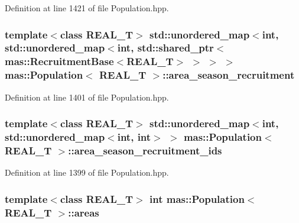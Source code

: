 Definition at line 1421 of file Population.\-hpp.

\hypertarget{classmas_1_1_population_ae6b75bd5f2b821e43b3b256255f1b8d6}{
\subsubsection[{area\-\_\-season\-\_\-recruitment}]{\setlength{\rightskip}{0pt plus 5cm}template$<$class R\-E\-A\-L\-\_\-\-T$>$ std\-::unordered\-\_\-map$<$int, std\-::unordered\-\_\-map$<$int, std\-::shared\-\_\-ptr$<${\bf mas\-::\-Recruitment\-Base}$<$R\-E\-A\-L\-\_\-\-T$>$ $>$ $>$ $>$ {\bf mas\-::\-Population}$<$ R\-E\-A\-L\-\_\-\-T $>$\-::area\-\_\-season\-\_\-recruitment}}\label{classmas_1_1_population_ae6b75bd5f2b821e43b3b256255f1b8d6}


Definition at line 1401 of file Population.\-hpp.

\hypertarget{classmas_1_1_population_a06d567e1aee12655a0442ff6e79464b7}{
\subsubsection[{area\-\_\-season\-\_\-recruitment\-\_\-ids}]{\setlength{\rightskip}{0pt plus 5cm}template$<$class R\-E\-A\-L\-\_\-\-T$>$ std\-::unordered\-\_\-map$<$int, std\-::unordered\-\_\-map$<$int, int$>$ $>$ {\bf mas\-::\-Population}$<$ R\-E\-A\-L\-\_\-\-T $>$\-::area\-\_\-season\-\_\-recruitment\-\_\-ids}}\label{classmas_1_1_population_a06d567e1aee12655a0442ff6e79464b7}


Definition at line 1399 of file Population.\-hpp.

\hypertarget{classmas_1_1_population_a5dbc73c77f78382e1d7dadfa1b24dfb8}{
\subsubsection[{areas}]{\setlength{\rightskip}{0pt plus 5cm}template$<$class R\-E\-A\-L\-\_\-\-T$>$ int {\bf mas\-::\-Population}$<$ R\-E\-A\-L\-\_\-\-T $>$\-::areas}}\label{classmas_1_1_population_a5dbc73c77f78382e1d7dadfa1b24dfb8}


